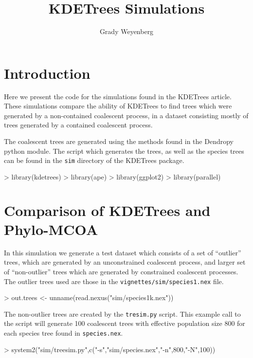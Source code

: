 \documentclass{article}
\title{KDETrees Simulations}
\author{Grady Weyenberg}
\begin{document}
\maketitle
\section{Introduction}
\label{sec:introduction}
Here we present the code for the simulations found in the KDETrees
article. These simulations compare the ability of KDETrees to find
trees which were generated by a non-contained coalescent process, in a
dataset consisting mostly of trees generated by a contained coalescent
process.

The coalescent trees are generated using the methods found in the
Dendropy python module. The script which generates the trees, as well
as the species trees can be found in the {\tt sim} directory of the
KDETrees package.

\begin{Schunk}
\begin{Sinput}
> library(kdetrees)
> library(ape)
> library(ggplot2)
> library(parallel)
\end{Sinput}
\end{Schunk}

\section{Comparison of KDETrees and Phylo-MCOA}
\label{sec:comp-kdetr-phylo}
In this simulation we generate a test dataset which consists of a set
of 
``outlier'' trees, which are generated by an unconstrained coalescent
process, and larger set of ``non-outlier'' trees which are generated by
constrained coalescent processes. The outlier trees used are those in
the {\tt vignettes/sim/species1.nex} file.
\begin{Schunk}
\begin{Sinput}
> out.trees <- unname(read.nexus("sim/species1k.nex"))
\end{Sinput}
\end{Schunk}
The non-outlier trees are created by the {\tt tresim.py} script.
This example call to the script will generate 100 coalescent trees
with effective population size 800 for each species tree found in
{\tt species.nex}.
\begin{Schunk}
\begin{Sinput}
> system2("sim/treesim.py",c("-s","sim/species.nex","-n",800,"-N",100))
\end{Sinput}
\end{Schunk}
\end{document}
